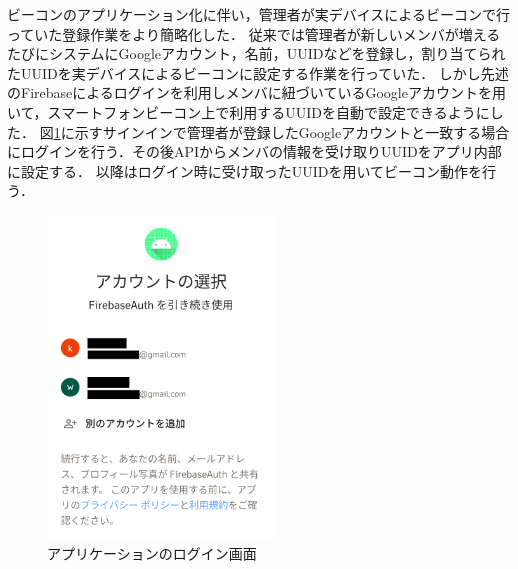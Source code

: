 ビーコンのアプリケーション化に伴い，管理者が実デバイスによるビーコンで行っていた登録作業をより簡略化した．
従来では管理者が新しいメンバが増えるたびにシステムにGoogleアカウント，名前，UUIDなどを登録し，割り当てられたUUIDを実デバイスによるビーコンに設定する作業を行っていた．
しかし先述のFirebaseによるログインを利用しメンバに紐づいているGoogleアカウントを用いて，スマートフォンビーコン上で利用するUUIDを自動で設定できるようにした．
図\ref{fig:AppSignIn}に示すサインインで管理者が登録したGoogleアカウントと一致する場合にログインを行う．その後APIからメンバの情報を受け取りUUIDをアプリ内部に設定する．
以降はログイン時に受け取ったUUIDを用いてビーコン動作を行う．
\begin{figure}[tbh]
  \centering
  \includegraphics[width=6cm]{image/AppSignIn.png}
  \caption{アプリケーションのログイン画面}
  \label{fig:AppSignIn}
\end{figure}

